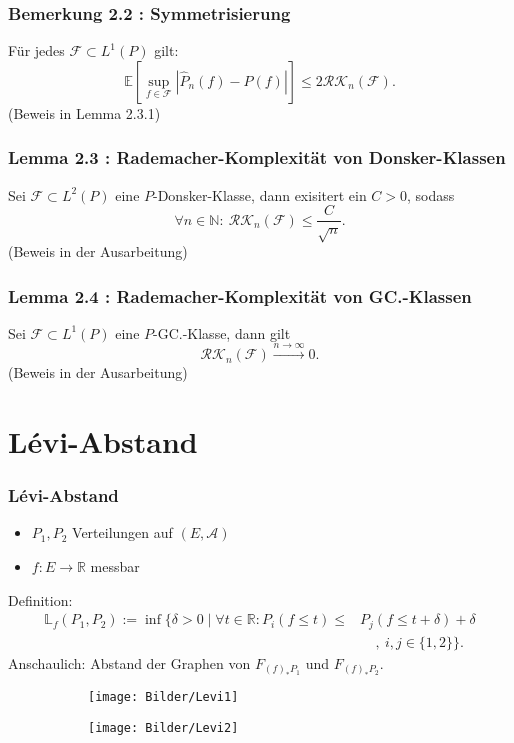 \documentclass{beamer}
\newcommand{\R}{\mathbb{R}} %
\newcommand{\N}{\mathbb{N}} %
\newcommand{\E}{\mathbb{E}} %
\newcommand{\F}{\mathcal{F}}
\begin{document}
	\begin{frame}
		\frametitle{Bemerkung 2.2 : Symmetrisierung}
		Für jedes $\mathcal{F} \subset L^1(P)$ gilt:
		$$
		\E\left[ \sup\limits_{f \in \F} \left| \hat{P}_n(f) - P(f) \right| \right] \leq 2 \mathcal{RK}_n(\F) .
		$$
		(Beweis in \cite{VaartWCEP} Lemma 2.3.1)
	\end{frame}
	
	\begin{frame}
		\frametitle{Lemma 2.3 : Rademacher-Komplexität von Donsker-Klassen}
		Sei $\F \subset L^2(P)$ eine $P$-Donsker-Klasse,
		dann exisitert ein $C > 0$, sodass
		$$
		\forall n \in \N : \ \mathcal{RK}_n(\F) \leq \frac{C}{\sqrt{n}} .
		$$
		(Beweis in der Ausarbeitung)
	\end{frame}
	
	\begin{frame}
		\frametitle{Lemma 2.4 : Rademacher-Komplexität von GC.-Klassen}
		Sei $\F \subset L^1(P)$ eine $P$-GC.-Klasse,
		dann gilt
		$$
		\mathcal{RK}_n(\F) \xrightarrow{n \rightarrow \infty} 0 .
		$$
		(Beweis in der Ausarbeitung)
	\end{frame}


	\section{L\'evi-Abstand}
	
	\begin{frame}
		\frametitle{L\'evi-Abstand}
		\begin{itemize}
			\item $P_1,P_2$ Verteilungen auf $(E,\mathcal{A})$
			\item $f: E \rightarrow \R$ messbar
		\end{itemize}
		Definition:
		\begin{align*}
		\mathbb{L}_f(P_1,P_2) := \inf \big\{ \delta > 0 \mid \forall t \in \R : P_i(f \leq t) \leq & P_j( f \leq t + \delta ) + \delta\\
		& \ \ \ \ \ , \ i,j \in \{1,2\} \big\} .
		\end{align*}
		\pause
		Anschaulich: Abstand der Graphen von $F_{(f)_*P_1}$ und $F_{(f)_*P_2}$.
		\begin{figure}[H]
			\centering
			\begin{subfigure}{.5\textwidth}
				\centering
				\texttt{[image: Bilder/Levi1]}
			\end{subfigure}%
			\begin{subfigure}{.5\textwidth}
				\centering
				\texttt{[image: Bilder/Levi2]}
			\end{subfigure}
		\end{figure}
	\end{frame}
	
\end{document}
